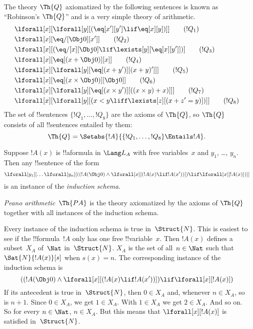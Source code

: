 \documentclass[../../../include/open-logic-section]{subfiles}
\begin{document}
\begin{defn}
The theory $\Th{Q}$ axiomatized by the following sentences is known
as ``Robinson's $\Th{Q}$'' and is a very simple theory of arithmetic.
\begin{align*}
& \lforall[x][\lforall[y][(\eq[x'][y'] \lif \eq[x][y])]] \tag{$!Q_1$}\\
& \lforall[x][\eq/[\Obj 0][x']] \tag{$!Q_2$}\\
& \lforall[x][(\eq/[x][\Obj 0] \lif \lexists[y][\eq[x][y']])] \tag{$!Q_3$}\\
& \lforall[x][\eq[(x + \Obj 0)][x]] \tag{$!Q_4$}\\
& \lforall[x][\lforall[y][\eq[(x + y')][(x + y)']]] \tag{$!Q_5$}\\
& \lforall[x][\eq[(x \times \Obj 0)][\Obj 0]] \tag{$!Q_6$}\\
& \lforall[x][\lforall[y][\eq[(x \times y')][((x \times y) + x)]]] \tag{$!Q_7$}\\
& \lforall[x][\lforall[y][(x < y \liff \lexists[z][(x + z' = y)])]] \tag{$!Q_8$}
\end{align*}
The set of !!{sentence}s $\{!Q_1, \dots, !Q_8\}$ are the axioms of
$\Th{Q}$, so $\Th{Q}$ consists of all !!{sentence}s entailed by them:
\[
\Th{Q} = \Setabs{!A}{\{!Q_1, \dots, !Q_8\} \Entails !A}.
\]
\end{defn}

\begin{defn}
Suppose $!A(x)$ is !!a{formula} in $\Lang L_A$ with free variables~$x$
and $y_1$, \dots, $y_n$. Then any !!{sentence} of the form
\[
\lforall[y_1][\dots\lforall[y_n][((!A(\Obj 0) \land \lforall[x][(!A(x)
\lif !A(x'))]) \lif \lforall[x][!A(x)])]]
\]
is an instance of the \emph{induction schema}.

\emph{Peano arithmetic}~$\Th{PA}$ is the theory axiomatized by the
axioms of $\Th{Q}$ together with all instances of the induction
schema.
\end{defn}

\begin{explain}
Every instance of the induction schema is true in~$\Struct{N}$. This
is easiest to see if the !!{formula}~$!A$ only has one free
!!{variable}~$x$.  Then $!A(x)$ defines a subset~$X_A$ of~$\Nat$
in~$\Struct{N}$.  $X_A$ is the set of all~$n \in \Nat$ such that
$\Sat{N}{!A(x)}[s]$ when $s(x) = n$.  The corresponding instance of
the induction schema is
\[
((!A(\Obj 0) \land \lforall[x][(!A(x) \lif !A(x'))]) \lif \lforall[x][!A(x)])
\]
If its antecedent is true in~$\Struct{N}$, then $0 \in X_A$ and,
whenever $n \in X_A$, so is $n+1$.  Since $0 \in X_A$, we get $1 \in
X_A$. With $1 \in X_A$ we get $2 \in X_A$. And so on. So for every $n
\in \Nat$, $n \in X_A$. But this means that $\lforall[x][!A(x)]$ is
satisfied in~$\Struct{N}$.
\end{explain}
\end{document}
